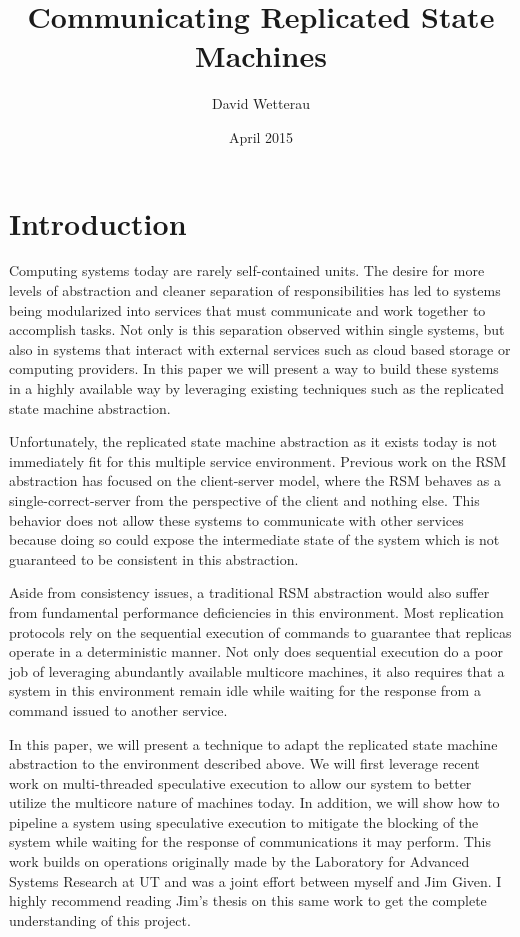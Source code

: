 \documentclass[11pt, oneside]{report}
\title{Communicating Replicated State Machines}
\author{David Wetterau}
\date{April 2015}
\begin{document}
\maketitle

\tableofcontents

\chapter{Introduction}\label{Introduction}
Computing systems today are rarely self-contained units. 
The desire for more levels of abstraction and cleaner separation of responsibilities has led to systems being modularized into services that must communicate and work together to accomplish tasks. 
Not only is this separation observed within single systems, but also in systems that interact with external services such as cloud based storage or computing providers. 
In this paper we will present a way to build these systems in a highly available way by leveraging existing techniques such as the replicated state machine abstraction.

Unfortunately, the replicated state machine abstraction as it exists today is not immediately fit for this multiple service environment. 
Previous work on the RSM abstraction has focused on the client-server model, where the RSM behaves as a single-correct-server from the perspective of the client and nothing else. 
This behavior does not allow these systems to communicate with other services because doing so could expose the intermediate state of the system which is not guaranteed to be consistent in this abstraction.

Aside from consistency issues, a traditional RSM abstraction would also suffer from fundamental performance deficiencies in this environment. 
Most replication protocols rely on the sequential execution of commands to guarantee that replicas operate in a deterministic manner. 
Not only does sequential execution do a poor job of leveraging abundantly available multicore machines, it also requires that a system in this environment remain idle while waiting for the response from a command issued to another service.

In this paper, we will present a technique to adapt the replicated state machine abstraction to the environment described above. 
We will first leverage recent work on multi-threaded speculative execution to allow our system to better utilize the multicore nature of machines today. 
In addition, we will show how to pipeline a system using speculative execution to mitigate the blocking of the system while waiting for the response of communications it may perform. 
This work builds on operations originally made by the Laboratory for Advanced Systems Research at UT and was a joint effort between myself and Jim Given. 
I highly recommend reading Jim’s thesis on this same work to get the complete understanding of this project.
\end{document}
